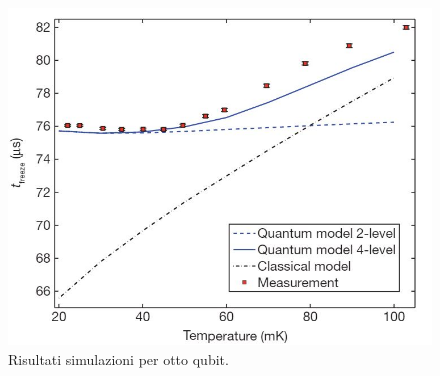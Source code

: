 \begin{figure}[htbp]
\centering
\includegraphics[scale=0.4]{Immagini/qa-chain.jpg}
\caption{Risultati simulazioni per otto qubit.}
\label{figura:qa-chain}
\end{figure}
